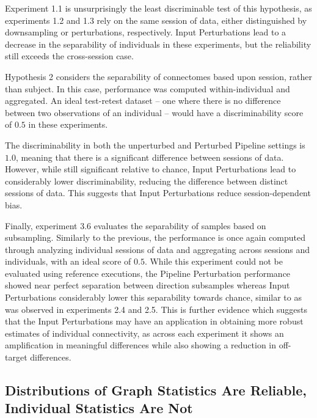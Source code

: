\documentclass[fleqn,10pt]{SelfArx} %
\begin{document}
Experiment 1.1 is unsurprisingly the least discriminable test of this hypothesis, as experiments 1.2 and 1.3 rely on
the same session of data, either distinguished by downsampling or perturbations, respectively. Input Perturbations lead
to a decrease in the separability of individuals in these experiments, but the reliability still exceeds the
cross-session case.

Hypothesis 2 considers the separability of connectomes based upon session, rather than subject. In this case,
performance was computed within-individual and aggregated. An ideal test-retest dataset – one where there is no
difference between two observations of an individual – would have a discriminability score of $0.5$ in these
experiments.

The discriminability in both the unperturbed and Perturbed Pipeline settings is $1.0$, meaning that there is a
significant difference between sessions of data. However, while still significant relative to chance, Input
Perturbations lead to considerably lower discriminability, reducing the difference between distinct sessions of data.
This suggests that Input Perturbations reduce session-dependent bias.

Finally, experiment 3.6 evaluates the separability of samples based on subsampling. Similarly to the previous, the
performance is once again computed through analyzing individual sessions of data and aggregating across sessions and
individuals, with an ideal score of $0.5$. While this experiment could not be evaluated using reference executions, the
Pipeline Perturbation performance showed near perfect separation between direction subsamples whereas Input
Perturbations considerably lower this separability towards chance, similar to as was observed in experiments 2.4 and
2.5. This is further evidence which suggests that the Input Perturbations may have an application in obtaining more
robust estimates of individual connectivity, as across each experiment it shows an amplification in meaningful
differences while also showing a reduction in off-target differences.

\subsection*{Distributions of Graph Statistics Are Reliable, Individual Statistics Are Not}
\end{document}
